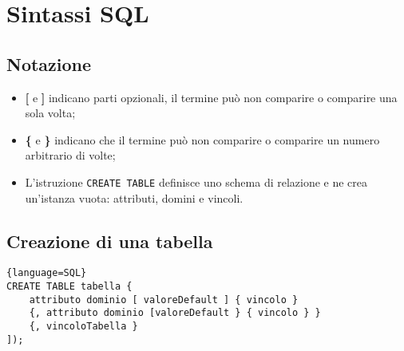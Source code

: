\documentclass[11pt]{report}
\begin{document}
\section{Sintassi SQL}
\subsection{Notazione}
\begin{itemize}
\item \textbf{[} e \textbf{]} indicano parti opzionali, il termine pu\`o non comparire o comparire una sola volta;
\item \textbf{\{} e \textbf{\}} indicano che il termine pu\`o non comparire o comparire un numero arbitrario di volte;
\item L'istruzione \texttt{CREATE TABLE} definisce uno schema di relazione e ne crea un'istanza vuota: attributi, domini e vincoli.

\end{itemize}

\subsection{Creazione di una tabella}

\begin{lstlisting}{language=SQL}
CREATE TABLE tabella {
	attributo dominio [ valoreDefault ] { vincolo }
	{, attributo dominio [valoreDefault } { vincolo } }
	{, vincoloTabella }
]);
\end{lstlisting}
\end{document}

